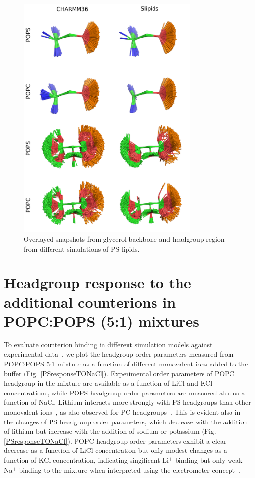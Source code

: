 \documentclass[journal=jpcbfk]{achemso}
\begin{document}
\begin{figure}[]
  \centering
  \includegraphics[width=9.0cm]{../Figs/figS8_POPC.png}
  \caption{\label{HGandGLYstructuresPSPC}
    Overlayed snapshots from glycerol backbone and headgroup region from 
    different simulations of PS lipids.
  }
\end{figure}




\pagebreak

\section{Headgroup response to the additional counterions in POPC:POPS (5:1) mixtures}\label{mixtureTOadditionalCIs}
To evaluate counterion binding in different simulation models against experimental data~\cite{roux90},
we plot the headgroup order parameters measured from POPC:POPS 5:1 mixture
as a function of different monovalent ions added to the buffer (Fig. \ref{PSresponseTONaCl}). 
Experimental order parameters of POPC headgroup in the mixture are available as a function
of LiCl and KCl concentrations, while POPS headgroup order parameters are measured also
as a function of NaCl. Lithium interacts more strongly with PS headgroups than other monovalent 
ions~\cite{hauser83,hauser85,roux86,mattai89,roux90}, as also observed for PC headgroups~\cite{cevc90}. 
This is evident also in the changes of PS headgroup order parameters, which decrease with the addition of lithium 
but increase with the addition of sodium or potassium (Fig. \ref{PSresponseTONaCl}). 
POPC headgroup order parameters exhibit a clear decrease as a function of LiCl concentration
but only modest changes as a function of KCl concentration, indicating singificant 
Li$^+$ binding but only weak Na$^+$ binding to the mixture when interpreted using the
electrometer concept~\cite{akutsu81,altenbach84,seelig87}.
\end{document}
